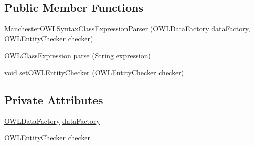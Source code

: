 \subsection*{Public Member Functions}
\begin{DoxyCompactItemize}
\item 
\hyperlink{classorg_1_1coode_1_1owlapi_1_1manchesterowlsyntax_1_1_manchester_o_w_l_syntax_class_expression_parser_a124a0ad3ee22e5100f722388a7af4468}{Manchester\-O\-W\-L\-Syntax\-Class\-Expression\-Parser} (\hyperlink{interfaceorg_1_1semanticweb_1_1owlapi_1_1model_1_1_o_w_l_data_factory}{O\-W\-L\-Data\-Factory} \hyperlink{classorg_1_1coode_1_1owlapi_1_1manchesterowlsyntax_1_1_manchester_o_w_l_syntax_class_expression_parser_ab1fffba70e8af6e119cf7cdccd25a7cc}{data\-Factory}, \hyperlink{interfaceorg_1_1semanticweb_1_1owlapi_1_1expression_1_1_o_w_l_entity_checker}{O\-W\-L\-Entity\-Checker} \hyperlink{classorg_1_1coode_1_1owlapi_1_1manchesterowlsyntax_1_1_manchester_o_w_l_syntax_class_expression_parser_ab53f75d7bb6ab9fa67c552c1aa8d2f65}{checker})
\item 
\hyperlink{interfaceorg_1_1semanticweb_1_1owlapi_1_1model_1_1_o_w_l_class_expression}{O\-W\-L\-Class\-Expression} \hyperlink{classorg_1_1coode_1_1owlapi_1_1manchesterowlsyntax_1_1_manchester_o_w_l_syntax_class_expression_parser_a3c3d260fd372b5dad3da4a023e26b7ba}{parse} (String expression)
\item 
void \hyperlink{classorg_1_1coode_1_1owlapi_1_1manchesterowlsyntax_1_1_manchester_o_w_l_syntax_class_expression_parser_aa6b5e380ba98fc7c6e9bbd4216d54d36}{set\-O\-W\-L\-Entity\-Checker} (\hyperlink{interfaceorg_1_1semanticweb_1_1owlapi_1_1expression_1_1_o_w_l_entity_checker}{O\-W\-L\-Entity\-Checker} \hyperlink{classorg_1_1coode_1_1owlapi_1_1manchesterowlsyntax_1_1_manchester_o_w_l_syntax_class_expression_parser_ab53f75d7bb6ab9fa67c552c1aa8d2f65}{checker})
\end{DoxyCompactItemize}
\subsection*{Private Attributes}
\begin{DoxyCompactItemize}
\item 
\hyperlink{interfaceorg_1_1semanticweb_1_1owlapi_1_1model_1_1_o_w_l_data_factory}{O\-W\-L\-Data\-Factory} \hyperlink{classorg_1_1coode_1_1owlapi_1_1manchesterowlsyntax_1_1_manchester_o_w_l_syntax_class_expression_parser_ab1fffba70e8af6e119cf7cdccd25a7cc}{data\-Factory}
\item 
\hyperlink{interfaceorg_1_1semanticweb_1_1owlapi_1_1expression_1_1_o_w_l_entity_checker}{O\-W\-L\-Entity\-Checker} \hyperlink{classorg_1_1coode_1_1owlapi_1_1manchesterowlsyntax_1_1_manchester_o_w_l_syntax_class_expression_parser_ab53f75d7bb6ab9fa67c552c1aa8d2f65}{checker}
\end{DoxyCompactItemize}


